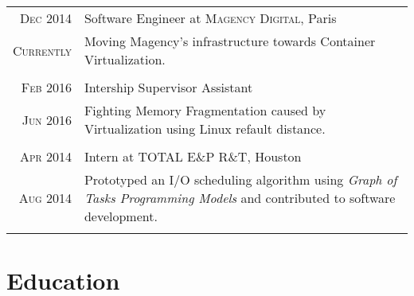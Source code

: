 \documentclass[a4paper,10pt]{article} %
\begin{document}
\begin{tabular}{r|p{11cm}}


\textsc{Dec 2014} & Software Engineer at \textsc{Magency Digital}, Paris\\
\textsc{Currently} & \footnotesize{
						Moving Magency's infrastructure towards Container Virtualization.
					}\\
\multicolumn{2}{c}{} \\


\textsc{Feb 2016} & Intership Supervisor Assistant\\
\textsc{Jun 2016} & \footnotesize{Fighting Memory Fragmentation caused by Virtualization using Linux refault distance.}\\
\multicolumn{2}{c}{} \\


\textsc{Apr 2014} & Intern at \textsc{TOTAL E\&P R\&T}, Houston\\
\textsc{Aug 2014} & \footnotesize{
						Prototyped an I/O scheduling algorithm using \emph{Graph of Tasks Programming Models} and contributed to software development.
					}\\
\multicolumn{2}{c}{} \\



\end{tabular}


\section{Education}
\end{document}
